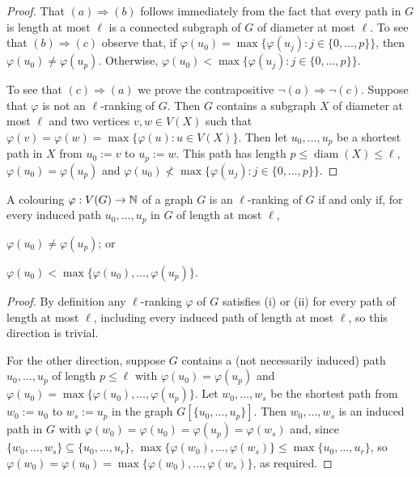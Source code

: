 \documentclass[kpfonts]{patmorin}
\DeclareMathOperator{\diam}{diam}
\theoremstyle{named}
\begin{document}
\begin{proof}
  That $(a)\Rightarrow (b)$ follows immediately from the fact that every path in $G$ is length at most $\ell$ is a connected subgraph of $G$ of diameter at most $\ell$.  To see that $(b)\Rightarrow(c)$ observe that, if $\varphi(u_0)=\max\{\varphi(u_j):j\in\{0,\ldots,p\}\}$, then $\varphi(u_0)\neq\varphi(u_p)$.  Otherwise, $\varphi(u_0)<\max\{\varphi(u_j):j\in\{0,\ldots,p\}\}$.

  To see that $(c)\Rightarrow (a)$ we prove the contrapositive $\neg(a)\Rightarrow\neg(c)$. Suppose that $\varphi$ is not an $\ell$-ranking of $G$. Then $G$ contains a subgraph $X$ of diameter at most $\ell$ and two vertices $v,w\in V(X)$ such that $\varphi(v)=\varphi(w)=\max\{\varphi(u):u\in V(X)\}$.  Then let $u_0,\ldots,u_p$ be a shortest path in $X$ from $u_0:=v$ to $u_p:=w$.  This path has length $p\le\diam(X)\le\ell$, $\varphi(u_0)=\varphi(u_p)$ and $\varphi(u_0)\not<\max\{\varphi(u_j):j\in\{0,\ldots,p\}\}$.
\end{proof}


\begin{obs}\label{induced-paths-only}
    A colouring $\varphi:V(G)\to\mathbb{N}$ of a graph $G$ is an $\ell$-ranking of $G$ if and only if, for every induced path $u_0,\ldots,u_p$ in $G$ of length at most $\ell$,
    \begin{inparaenum}[(i)]
        \item $\varphi(u_0)\neq\varphi(u_p)$; or
        \item $\varphi(u_0)<\max\{\varphi(u_0),\ldots,\varphi(u_p)\}$.
    \end{inparaenum}
\end{obs}

\begin{proof}
    By definition any $\ell$-ranking $\varphi$ of $G$ satisfies (i) or (ii) for every path of length at most $\ell$, including every induced path of length at most $\ell$, so this direction is trivial.

    For the other direction, suppose $G$ contains a (not necessarily induced) path $u_0,\ldots,u_p$ of length $p\le\ell$ with $\varphi(u_0)=\varphi(u_p)$ and $\varphi(u_0)=\max\{\varphi(u_0),\ldots,\varphi(u_p)\}$.  Let $w_0,\ldots,w_s$ be the shortest path from $w_0:=u_0$ to $w_s:=u_p$ in  the graph $G[\{u_0,\ldots,u_p\}]$.  Then $w_0,\ldots,w_s$ is an induced path in $G$ with $\varphi(w_0)=\varphi(u_0)=\varphi(u_p)=\varphi(w_s)$ and, since $\{w_0,\ldots,w_{s}\}\subseteq\{u_0,\ldots,u_{r}\}$, $\max\{\varphi(w_0),\ldots,\varphi(w_{s})\}\le\max\{u_0,\ldots,u_{r}\}$, so $\varphi(w_0)=\varphi(u_0)=\max\{\varphi(w_0),\ldots,\varphi(w_s)\}$, as required.
\end{proof}
\end{document}
